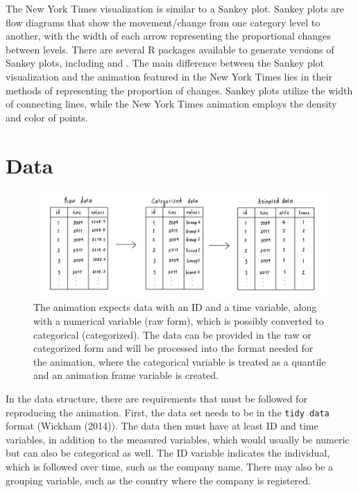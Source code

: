 The New York Times visualization is similar to a Sankey plot. Sankey plots are flow diagrams that show the movement/change from one category level to another, with the width of each arrow representing the proportional changes between levels. There are several R packages available to generate versions of Sankey plots, including  and . The main difference between the Sankey plot visualization and the animation featured in the New York Times lies in their methods of representing the proportion of changes. Sankey plots utilize the width of connecting lines, while the New York Times animation employs the density and color of points.

\hypertarget{data}{%
\section{Data}\label{data}}

\begin{figure}

{\centering \includegraphics[width=1\linewidth]{figures/data-diagram} 

}

\caption{The animation expects data with an ID and a time variable, along with a numerical variable (raw form), which is possibly converted to categorical (categorized). The data can be provided in the raw or categorized form and will be processed into the format needed for the animation, where the categorical variable is treated as a quantile and an animation frame variable is created.}\label{fig:data-diagram}
\end{figure}

In the data structure, there are requirements that must be followed for reproducing the animation. First, the data set needs to be in the \texttt{tidy\ data} format (Wickham (2014)). The data then must have at least ID and time variables, in addition to the measured variables, which would usually be numeric but can also be categorical as well. The ID variable indicates the individual, which is followed over time, such as the company name. There may also be a grouping variable, such as the country where the company is registered.

